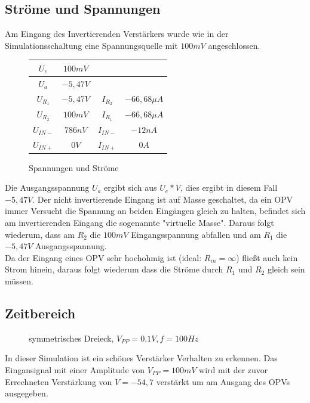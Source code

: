 \subsection{Str\"ome und Spannungen}
Am Eingang des Invertierenden Verst\"arkers wurde wie in der Simulationsschaltung eine Spannungsquelle mit $100mV$ angeschlossen.

\begin{figure}[H]
  \centering
  \begin{tabular}{c|c||c|c}
    $U_e$ & $100mV$ & & \\ \hline
    $U_a$ & $-5,47V$ & & \\ \hline
    $U_{R_1}$ & $-5,47V$ & $I_{R_2}$ & $-66,68\mu A$  \\ \hline
    $U_{R_2}$ & $100mV$ & $I_{R_1}$ & $-66,68\mu A$  \\ \hline
    $U_{IN-}$ & $786nV$ & $I_{IN-}$ & $-12nA$  \\ \hline
    $U_{IN+}$ & $0V$ & $I_{IN+}$ & $0A$
  \end{tabular}
  \caption{Spannungen und Str\"ome}
\end{figure}
\noindent
Die Ausgangsspannung $U_a$ ergibt sich aus $U_e*V$, dies ergibt in diesem Fall $-5,47V$. Der nicht invertierende Eingang ist auf Masse geschaltet, da ein OPV immer Versucht die Spannung an beiden Eing\"angen gleich zu halten, befindet sich am invertierenden Eingang die sogenannte "virtuelle Masse". Daraus folgt wiederum, dass am $R_2$ die $100mV$ Eingangsspannung abfallen und am $R_1$ die $-5,47V$ Ausgangsspannung.
\\ Da der Eingang eines OPV sehr hochohmig ist (ideal: $R_{in}=\infty$) flie\ss{}t auch kein Strom hinein,  daraus folgt wiederum dass die Str\"ome durch $R_1$ und $R_2$ gleich sein m\"ussen.

\subsection{Zeitbereich}
\begin{figure}[H]
  \centering
  \caption{symmetrisches Dreieck, $V_{PP}=0.1V, f=100Hz$}
\end{figure}
\noindent
In dieser Simulation ist ein sch\"ones Verst\"arker Verhalten zu erkennen. Das Eingansignal mit einer Amplitude von $V_{PP} = 100mV$ wird mit der zuvor Errechneten Verst\"arkung von $V=-54,7$ verst\"arkt um am Ausgang des OPVs ausgegeben.

